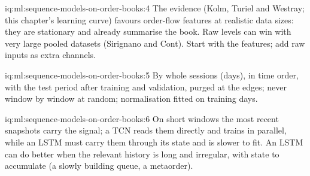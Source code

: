 \begin{solution}{iq:ml:sequence-models-on-order-books:4}
The evidence (Kolm, Turiel and Westray; this chapter's learning curve) favours order-flow features at realistic data sizes:
they are stationary and already summarise the book. Raw levels can win with very large pooled datasets (Sirignano and
Cont). Start with the features; add raw inputs as extra channels.
\end{solution}

\begin{solution}{iq:ml:sequence-models-on-order-books:5}
By whole sessions (days), in time order, with the test period after training and validation, purged at the edges; never
window by window at random; normalisation fitted on training days.
\end{solution}

\begin{solution}{iq:ml:sequence-models-on-order-books:6}
On short windows the most recent snapshots carry the signal; a TCN reads them directly and trains in parallel, while an
LSTM must carry them through its state and is slower to fit. An LSTM can do better when the relevant history is long and
irregular, with state to accumulate (a slowly building queue, a metaorder).
\end{solution}
